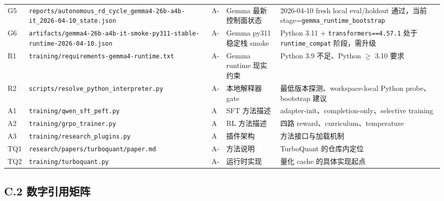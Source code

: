 \documentclass[11pt,a4paper]{article}
\newcommand{\code}[1]{\begingroup\ttfamily\footnotesize\nolinkurl{#1}\endgroup}
\begin{document}
\begin{longtable}{p{0.9cm} T{5.1cm} p{0.8cm} p{1.6cm} p{5.4cm}}
G5 & \code{reports/autonomous_rd_cycle_gemma4-26b-a4b-it_2026-04-10\_state.json} & A- & Gemma 最新控制面状态 & 2026-04-10 fresh local eval/holdout 通过，当前 stage=\code{gemma\_runtime\_bootstrap} \\
G6 & \code{artifacts/gemma4-26b-a4b-it-smoke-py311-stable-runtime-2026-04-10.json} & A- & Gemma py311 稳定栈 smoke & Python 3.11 + \code{transformers==4.57.1} 处于 \code{runtime\_compat} 阶段，需升级 \\
R1 & \code{training/requirements-gemma4-runtime.txt} & A- & Gemma runtime 现实约束 & Python 3.9 不足、Python $\geq$ 3.10 要求 \\
R2 & \code{scripts/resolve_python_interpreter.py} & A- & 本地解释器 gate & 最低版本探测、workspace-local Python probe、bootstrap 建议 \\
A1 & \code{training/qwen_sft_peft.py} & A & SFT 方法描述 & adapter-init、completion-only、selective training \\
A2 & \code{training/grpo_trainer.py} & A & RL 方法描述 & 四路 reward、curriculum、temperature \\
A3 & \code{training/research_plugins.py} & A & 插件架构 & 方法接口与加载机制 \\
TQ1 & \code{research/papers/turboquant/paper.md} & A- & 方法说明 & TurboQuant 的仓库内定位 \\
TQ2 & \code{training/turboquant.py} & A- & 运行时实现 & 量化 cache 的具体实现起点 \\
\bottomrule
\end{longtable}
\normalsize

\subsection{C.2 数字引用矩阵}
\end{document}

